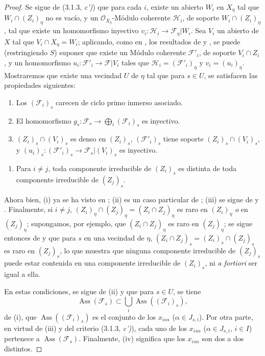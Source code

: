 \begin{proof}
\label{IV.9.8.3-proof}
Se sigue de (3.1.3, \emph{c')}) que para cada $i$, existe un abierto $W_i$ en $X_\eta$ tal que $W_i\cap(Z_i)_\eta$ no es vacío, y un $\mathcal O_{X_\eta}$-Módulo coherente $\mathcal H_i$, de soporte $W_i\cap(Z_i)_\eta$, tal que existe un homomorfismo inyectivo $v_i:\mathcal H_i\to\mathcal F_\eta|W_i$.
Sea $V_i$ un abierto de $X$ tal que $V_i\cap X_\eta=W_i$; aplicando, como en , los resultados de  y , se puede (restringiendo $S$) suponer que existe un Módulo coherente $\mathcal F'_i$, de soporte $V_i\cap Z_i$, y un homomorfismo $u_i:\mathcal F'_i\to\mathcal F|V_i$ tales que $\mathcal H_i=(\mathcal F'_i)_\eta$ y $v_i=(u_i)_\eta$.
Mostraremos que existe una vecindad $U$ de $\eta$ tal que para $s\in U$, se satisfacen las propiedades siguientes:
\begin{enumerate}[label=(\roman*)]
  \item Los $(\mathcal F_i)_s$ carecen de ciclo primo inmerso asociado.
  \item El homomorfismo $g_s:\mathcal F_s\to\bigoplus_i(\mathcal F_i)_s$ es inyectivo.
  \item $(Z_i)_s\cap(V_i)_s$ es denso en $(Z_i)_s$, $(\mathcal F'_i)_s$ tiene soporte $(Z_i)_s\cap(V_i)_s$, y $(u_i)_s:(\mathcal F'_i)_s\to\mathcal F_s|(V_i)_s$ es inyectivo.
\end{enumerate}

\begin{enumerate}[label=(\roman*)]
  \item[(iv)] Para $i\neq j$, toda componente irreducible de $(Z_i)_s$ es distinta de toda componente irreducible de $(Z_j)_s$.
\end{enumerate}

Ahora bien, (i) ya se ha visto en ; (ii) es un caso particular de ; (iii) se sigue de  y .
Finalmente, si $i\neq j$, $(Z_i)_\eta\cap(Z_j)_\eta=(Z_i\cap Z_j)_\eta$ es raro en $(Z_i)_\eta$ \emph{o} en $(Z_j)_\eta$; supongamos, por ejemplo, que $(Z_i\cap Z_j)_\eta$ es raro en $(Z_j)_\eta$; se sigue entonces de  y  que para $s$ en una vecindad de $\eta$, $(Z_i\cap Z_j)_s=(Z_i)_s\cap(Z_j)_s$ es raro en $(Z_j)_s$, lo que muestra que ninguna componente irreducible de $(Z_j)_s$ puede estar contenida en una componente irreducible de $(Z_i)_s$, ni \emph{a fortiori} ser igual a ella.

En estas condiciones, se sigue de (ii) y  que para $s\in U$, se tiene
\[
\operatorname{Ass}(\mathcal F_s)\subset
\bigcup_i\operatorname{Ass}((\mathcal F_i)_s),
\]
de (i), que $\operatorname{Ass}((\mathcal F_i)_s)$ es el conjunto de los $x_{is\alpha}$ ($\alpha\in J_{s,i}$).
Por otra parte, en virtud de (iii) y del criterio (3.1.3, \emph{c')}), cada uno de los $x_{is\alpha}$ ($\alpha\in J_{s,i}$, $i\in I$) pertenece a $\operatorname{Ass}(\mathcal F_s)$.
Finalmente, (iv) significa que los $x_{is\alpha}$ son dos a dos distintos.


\end{proof}
